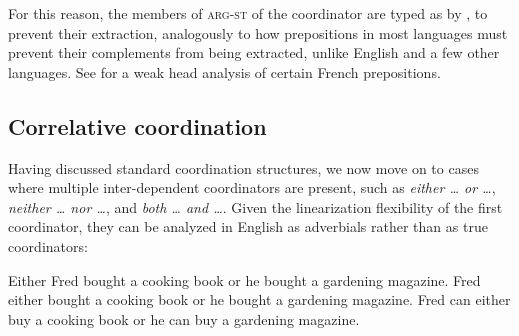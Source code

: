 \documentclass[output=paper
                ,modfonts
                ,nonflat
	        ,collection
	        ,collectionchapter
	        ,collectiontoclongg
 	        ,biblatex
                ,babelshorthands
                ,newtxmath
                ,draftmode
                ,colorlinks, citecolor=brown
]{./langsci/langscibook}
\begin{document}

\begin{exe}
\end{exe}\label{cc}




\noindent
For this reason, the members of \textsc{arg-st} of the coordinator are typed as  by \citet{Abeille:03}, to prevent their extraction, analogously to how prepositions in most languages must prevent their complements from being extracted, unlike English and a few other languages.
See \citet{Abeille:06} for a weak head analysis of certain French prepositions.




\subsection{Correlative coordination}\label{correlphr}


Having discussed standard coordination structures, we now move on to cases where
multiple inter-dependent coordinators are present, such as \emph{either \ldots{} or \ldots{}},
\emph{neither \ldots{} nor \ldots{}}, 
and \emph{both \ldots{} and \ldots{}}. Given the linearization flexibility of the first coordinator, they  can be analyzed in English as adverbials rather than as true coordinators:

\begin{exe}
 \ex
\begin{xlista}
\ex  Either Fred bought a cooking book or he bought a gardening magazine.
\ex  Fred either bought a cooking book or he bought a gardening magazine.
\ex  Fred can either buy a cooking book or he can buy a gardening magazine.
\end{xlista}
\end{exe}
\end{document}
